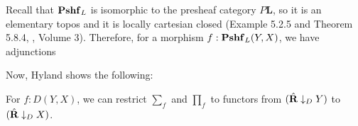 Recall that $ \mathbf{Pshf}_{L} $ is isomorphic to the presheaf category $ P \mathbf L $, so it is an elementary topos and it is locally cartesian closed (Example 5.2.5 and Theorem 5.8.4, \autocite{borceux}, Volume 3). Therefore, for a morphism $ f: \mathbf{Pshf}_{L}(Y, X) $, we have adjunctions
\begin{center}
\end{center}

Now, Hyland shows the following:
\begin{theorem}\label{thm:restrict-sum-product}
  For $ f : D(Y, X) $, we can restrict $ \sum_f $ and $ \prod_f $ to functors from $ (\hat {\mathbf{R}} \downarrow_D Y) $ to $ (\hat {\mathbf{R}} \downarrow_D X) $.
\end{theorem}
